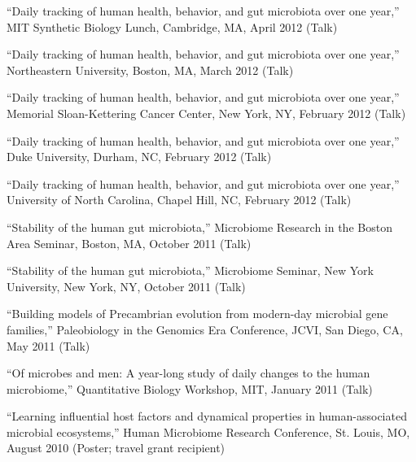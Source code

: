 \documentclass[overlapped,line,11pt]{res}
\begin{document}
\begin{resume}
\begin{revnumerate}[19]
\item {``Daily tracking of human health, behavior, and gut microbiota
  over one year,'' MIT Synthetic Biology Lunch, Cambridge, MA, April 2012 (Talk)}
\vspace*{1mm}

\item {``Daily tracking of human health, behavior, and gut microbiota
  over one year,'' Northeastern University, Boston, MA, March 2012 (Talk)}
\vspace*{1mm}

\item {``Daily tracking of human health, behavior, and gut microbiota
  over one year,'' Memorial Sloan-Kettering Cancer Center, New York, NY,
  February 2012 (Talk)}
\vspace*{1mm}

\item {``Daily tracking of human health, behavior, and gut microbiota
  over one year,'' Duke University, Durham, NC, February 2012 (Talk)}
\vspace*{1mm}

\item {``Daily tracking of human health, behavior, and gut microbiota
  over one year,'' University of North Carolina, Chapel Hill, NC, February 2012 (Talk)}
\vspace*{1mm}

\item {``Stability of the human gut microbiota,'' Microbiome Research
  in the Boston Area Seminar, Boston, MA, October 2011 (Talk)}
\vspace*{1mm}

\item {``Stability of the human gut microbiota,'' Microbiome Seminar,
  New York University, New York, NY, October 2011 (Talk)}
\vspace*{1mm}

\item {``Building models of Precambrian evolution from modern-day
  microbial gene families,'' Paleobiology in the Genomics Era
  Conference, JCVI, San Diego, CA, May 2011 (Talk)}
\vspace*{1mm}

\item {``Of microbes and men:
A year-long study of daily changes to the human microbiome,''
Quantitative Biology Workshop, MIT, January 2011 (Talk)}
\vspace*{1mm}

\item {``Learning influential host factors and dynamical properties in
human-associated microbial ecosystems,'' Human Microbiome Research
Conference, St. Louis, MO, August 2010 (Poster; travel grant recipient)}
\vspace*{1mm}


\end{revnumerate}
\end{resume}
\end{document}
